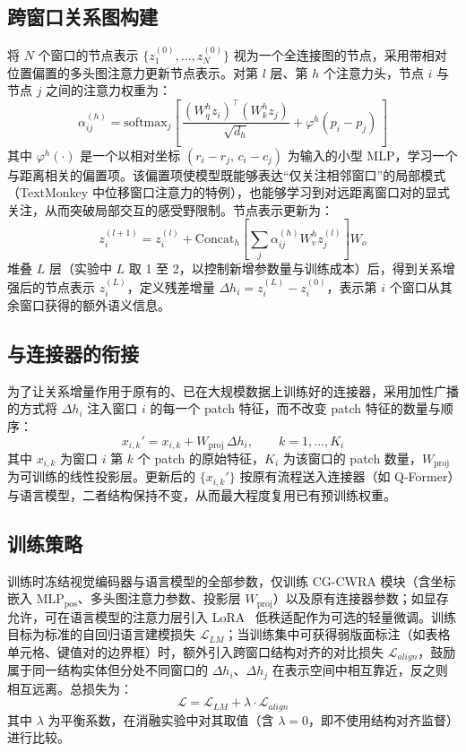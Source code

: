 \documentclass[journal]{IEEEtran}
\begin{document}
\subsection{跨窗口关系图构建}
将 $N$ 个窗口的节点表示 $\{z_1^{(0)}, \dots, z_N^{(0)}\}$ 视为一个全连接图的节点，采用带相对位置偏置的多头图注意力更新节点表示。对第 $l$ 层、第 $h$ 个注意力头，节点 $i$ 与节点 $j$ 之间的注意力权重为：
\begin{equation}
\alpha_{ij}^{(h)} = \mathrm{softmax}_j\!\left[\, \frac{(W_q^h z_i)^{\top}(W_k^h z_j)}{\sqrt{d_h}} + \varphi^h(p_i - p_j) \,\right]
\label{eq:attn}
\end{equation}
其中 $\varphi^h(\cdot)$ 是一个以相对坐标 $(r_i-r_j,\, c_i-c_j)$ 为输入的小型 MLP，学习一个与距离相关的偏置项。该偏置项使模型既能够表达“仅关注相邻窗口”的局部模式（TextMonkey 中位移窗口注意力的特例），也能够学习到对远距离窗口对的显式关注，从而突破局部交互的感受野限制。节点表示更新为：
\begin{equation}
z_i^{(l+1)} = z_i^{(l)} + \mathrm{Concat}_h\!\left[\sum_j \alpha_{ij}^{(h)} W_v^h z_j^{(l)}\right] W_o
\label{eq:update}
\end{equation}
堆叠 $L$ 层（实验中 $L$ 取 1 至 2，以控制新增参数量与训练成本）后，得到关系增强后的节点表示 $z_i^{(L)}$，定义残差增量 $\Delta h_i = z_i^{(L)} - z_i^{(0)}$，表示第 $i$ 个窗口从其余窗口获得的额外语义信息。

\subsection{与连接器的衔接}
为了让关系增量作用于原有的、已在大规模数据上训练好的连接器，采用加性广播的方式将 $\Delta h_i$ 注入窗口 $i$ 的每一个 patch 特征，而不改变 patch 特征的数量与顺序：
\begin{equation}
x_{i,k}' = x_{i,k} + W_{\mathrm{proj}}\, \Delta h_i, \qquad k = 1, \dots, K_i
\label{eq:inject}
\end{equation}
其中 $x_{i,k}$ 为窗口 $i$ 第 $k$ 个 patch 的原始特征，$K_i$ 为该窗口的 patch 数量，$W_{\mathrm{proj}}$ 为可训练的线性投影层。更新后的 $\{x_{i,k}'\}$ 按原有流程送入连接器（如 Q-Former）与语言模型，二者结构保持不变，从而最大程度复用已有预训练权重。

\subsection{训练策略}
训练时冻结视觉编码器与语言模型的全部参数，仅训练 CG-CWRA 模块（含坐标嵌入 $\mathrm{MLP}_{\mathrm{pos}}$、多头图注意力参数、投影层 $W_{\mathrm{proj}}$）以及原有连接器参数；如显存允许，可在语言模型的注意力层引入 LoRA~\cite{lora} 低秩适配作为可选的轻量微调。训练目标为标准的自回归语言建模损失 $\mathcal{L}_{LM}$；当训练集中可获得弱版面标注（如表格单元格、键值对的边界框）时，额外引入跨窗口结构对齐的对比损失 $\mathcal{L}_{align}$，鼓励属于同一结构实体但分处不同窗口的 $\Delta h_i$、$\Delta h_j$ 在表示空间中相互靠近，反之则相互远离。总损失为：
\begin{equation}
\mathcal{L} = \mathcal{L}_{LM} + \lambda \cdot \mathcal{L}_{align}
\label{eq:loss}
\end{equation}
其中 $\lambda$ 为平衡系数，在消融实验中对其取值（含 $\lambda=0$，即不使用结构对齐监督）进行比较。
\end{document}
